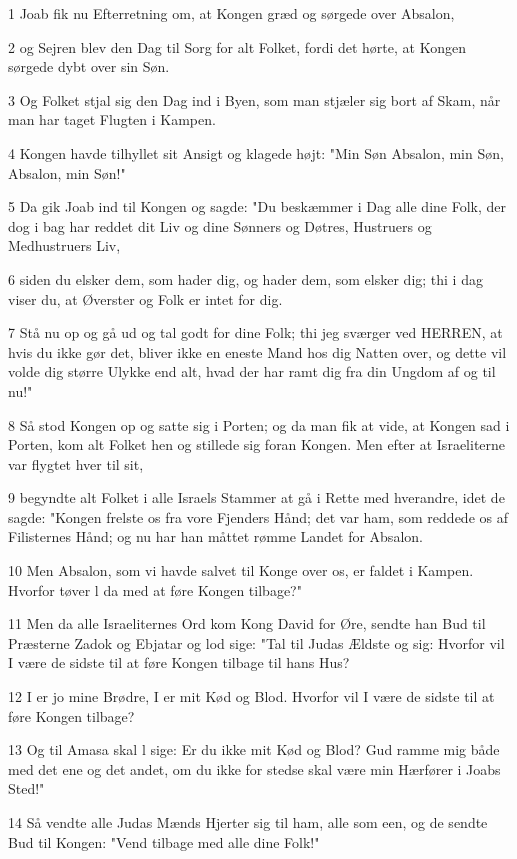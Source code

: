 \par 1 Joab fik nu Efterretning om, at Kongen græd og sørgede over Absalon,
\par 2 og Sejren blev den Dag til Sorg for alt Folket, fordi det hørte, at Kongen sørgede dybt over sin Søn.
\par 3 Og Folket stjal sig den Dag ind i Byen, som man stjæler sig bort af Skam, når man har taget Flugten i Kampen.
\par 4 Kongen havde tilhyllet sit Ansigt og klagede højt: "Min Søn Absalon, min Søn, Absalon, min Søn!"
\par 5 Da gik Joab ind til Kongen og sagde: "Du beskæmmer i Dag alle dine Folk, der dog i bag har reddet dit Liv og dine Sønners og Døtres, Hustruers og Medhustruers Liv,
\par 6 siden du elsker dem, som hader dig, og hader dem, som elsker dig; thi i dag viser du, at Øverster og Folk er intet for dig.
\par 7 Stå nu op og gå ud og tal godt for dine Folk; thi jeg sværger ved HERREN, at hvis du ikke gør det, bliver ikke en eneste Mand hos dig Natten over, og dette vil volde dig større Ulykke end alt, hvad der har ramt dig fra din Ungdom af og til nu!"
\par 8 Så stod Kongen op og satte sig i Porten; og da man fik at vide, at Kongen sad i Porten, kom alt Folket hen og stillede sig foran Kongen. Men efter at Israeliterne var flygtet hver til sit,
\par 9 begyndte alt Folket i alle Israels Stammer at gå i Rette med hverandre, idet de sagde: "Kongen frelste os fra vore Fjenders Hånd; det var ham, som reddede os af Filisternes Hånd; og nu har han måttet rømme Landet for Absalon.
\par 10 Men Absalon, som vi havde salvet til Konge over os, er faldet i Kampen. Hvorfor tøver l da med at føre Kongen tilbage?"
\par 11 Men da alle Israeliternes Ord kom Kong David for Øre, sendte han Bud til Præsterne Zadok og Ebjatar og lod sige: "Tal til Judas Ældste og sig: Hvorfor vil I være de sidste til at føre Kongen tilbage til hans Hus?
\par 12 I er jo mine Brødre, I er mit Kød og Blod. Hvorfor vil I være de sidste til at føre Kongen tilbage?
\par 13 Og til Amasa skal l sige: Er du ikke mit Kød og Blod? Gud ramme mig både med det ene og det andet, om du ikke for stedse skal være min Hærfører i Joabs Sted!"
\par 14 Så vendte alle Judas Mænds Hjerter sig til ham, alle som een, og de sendte Bud til Kongen: "Vend tilbage med alle dine Folk!"
